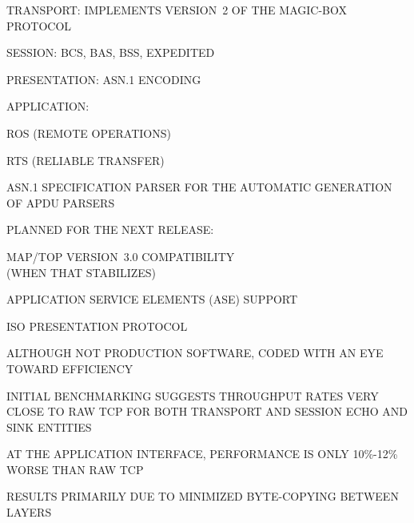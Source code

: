 \begin{bwslide}

\begin{nrtc}
\item	TRANSPORT: IMPLEMENTS VERSION~2 OF THE MAGIC-BOX PROTOCOL

\item	SESSION: BCS, BAS, BSS, EXPEDITED

\item	PRESENTATION: ASN.1 ENCODING


\item	APPLICATION: 
    \begin{nrtc}
    \item	ROS (REMOTE OPERATIONS)

    \item	RTS (RELIABLE TRANSFER)

    \item	ASN.1 SPECIFICATION PARSER FOR THE AUTOMATIC GENERATION OF
		APDU PARSERS
    \end{nrtc}

\item	PLANNED FOR THE NEXT RELEASE:
    \begin{nrtc}
    \item	MAP/TOP VERSION~3.0 COMPATIBILITY\\
		(WHEN THAT STABILIZES)

    \item	APPLICATION SERVICE ELEMENTS (ASE) SUPPORT

    \item	ISO PRESENTATION PROTOCOL
    \end{nrtc}
\end{nrtc}
\end{bwslide}


\begin{bwslide}

\begin{nrtc}
\item	ALTHOUGH NOT PRODUCTION SOFTWARE,
	CODED WITH AN EYE\\ TOWARD EFFICIENCY

\item	INITIAL BENCHMARKING SUGGESTS THROUGHPUT RATES VERY CLOSE TO RAW TCP
	FOR BOTH TRANSPORT AND SESSION ECHO AND SINK ENTITIES

\item	AT THE APPLICATION INTERFACE,
	PERFORMANCE IS ONLY 10\%-12\% WORSE THAN RAW TCP

\item	RESULTS PRIMARILY DUE TO MINIMIZED BYTE-COPYING BETWEEN\\
	LAYERS
\end{nrtc}
\end{bwslide}


